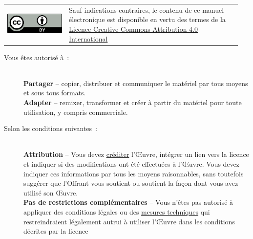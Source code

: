 \begin{tcolorbox}[
	colback=white, 
	colframe=black,
	toprule=1pt,
	bottomrule=1pt,
	leftrule=1pt,
	rightrule=1pt,
	before upper={\begin{minipage}[t]{\linewidth}},
    after upper={\end{minipage}},
]
\begin{tabular}{m{0.25\linewidth}m{0.7\linewidth}}
\includegraphics{images/CC/by.png} & 
Sauf indications contraires, le contenu de ce manuel électronique est disponible en vertu des termes de la \href{https://creativecommons.org/licenses/by/4.0/deed.fr}{Licence Creative Commons Attribution 4.0 International} \\
\end{tabular}
{\footnotesize
\begin{description}
  \item[Vous êtes autorisé à~:] ~\\
  \textbf{Partager} -- copier, distribuer et communiquer le matériel par tous moyens et sous tous formats.\\
  \textbf{Adapter} -- remixer, transformer et créer à partir du matériel pour toute utilisation, y compris commerciale.


\item[Selon les conditions suivantes~:] ~\\
  \textbf{Attribution} -- Vous devez \href{https://creativecommons.org/licenses/by/4.0/deed.fr\#}{créditer} l'Œuvre, intégrer un lien vers la licence et indiquer si des modifications ont été effectuées à l'Œuvre. Vous devez indiquer ces informations par tous les moyens raisonnables, sans toutefois suggérer que l'Offrant vous soutient ou soutient la façon dont vous avez utilisé son Œuvre.\\
  \textbf{Pas de restrictions complémentaires} -- Vous n'êtes pas autorisé à appliquer des conditions légales ou des \href{https://creativecommons.org/licenses/by/4.0/deed.fr\#}{mesures techniques} qui restreindraient légalement autrui à utiliser l'Œuvre dans les conditions décrites par la licence
\end{description}
}
\end{tcolorbox}


